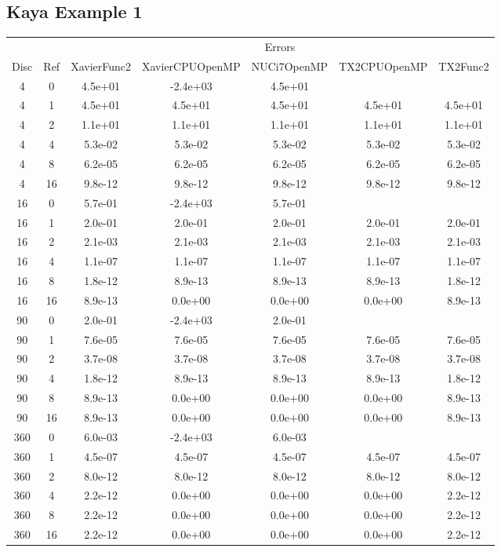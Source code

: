\subsection{Kaya Example 1}
\begin{center}
\begin{tabular}{c|c|c|c|c|c|c}
	&&\multicolumn{5}{c}{Errors}\\
	Disc&Ref&XavierFunc2&XavierCPUOpenMP&NUCi7OpenMP&TX2CPUOpenMP&TX2Func2\\
\hline
4&0&4.5e+01&-2.4e+03&4.5e+01\\
4&1&4.5e+01&4.5e+01&4.5e+01&4.5e+01&4.5e+01\\
4&2&1.1e+01&1.1e+01&1.1e+01&1.1e+01&1.1e+01\\
4&4&5.3e-02&5.3e-02&5.3e-02&5.3e-02&5.3e-02\\
4&8&6.2e-05&6.2e-05&6.2e-05&6.2e-05&6.2e-05\\
4&16&9.8e-12&9.8e-12&9.8e-12&9.8e-12&9.8e-12\\
\hline
16&0&5.7e-01&-2.4e+03&5.7e-01\\
16&1&2.0e-01&2.0e-01&2.0e-01&2.0e-01&2.0e-01\\
16&2&2.1e-03&2.1e-03&2.1e-03&2.1e-03&2.1e-03\\
16&4&1.1e-07&1.1e-07&1.1e-07&1.1e-07&1.1e-07\\
16&8&1.8e-12&8.9e-13&8.9e-13&8.9e-13&1.8e-12\\
16&16&8.9e-13&0.0e+00&0.0e+00&0.0e+00&8.9e-13\\
\hline
90&0&2.0e-01&-2.4e+03&2.0e-01\\
90&1&7.6e-05&7.6e-05&7.6e-05&7.6e-05&7.6e-05\\
90&2&3.7e-08&3.7e-08&3.7e-08&3.7e-08&3.7e-08\\
90&4&1.8e-12&8.9e-13&8.9e-13&8.9e-13&1.8e-12\\
90&8&8.9e-13&0.0e+00&0.0e+00&0.0e+00&8.9e-13\\
90&16&8.9e-13&0.0e+00&0.0e+00&0.0e+00&8.9e-13\\
\hline
360&0&6.0e-03&-2.4e+03&6.0e-03\\
360&1&4.5e-07&4.5e-07&4.5e-07&4.5e-07&4.5e-07\\
360&2&8.0e-12&8.0e-12&8.0e-12&8.0e-12&8.0e-12\\
360&4&2.2e-12&0.0e+00&0.0e+00&0.0e+00&2.2e-12\\
360&8&2.2e-12&0.0e+00&0.0e+00&0.0e+00&2.2e-12\\
360&16&2.2e-12&0.0e+00&0.0e+00&0.0e+00&2.2e-12\\
\hline
\end{tabular}
\end{center}







